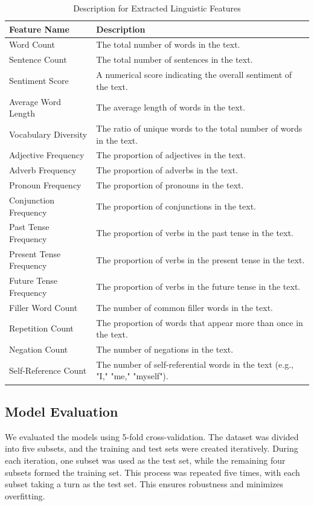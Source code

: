 \documentclass[12pt]{article}
\begin{document}
\begin{table}[H]
\centering
\begin{tabular}{p{5cm}p{7cm}}
\hline
\textbf{Feature Name} & \textbf{Description} \\
\hline
Word Count & The total number of words in the text. \\
\hline
Sentence Count & The total number of sentences in the text. \\
\hline
Sentiment Score & A numerical score indicating the overall sentiment of the text. \\
\hline
Average Word Length & The average length of words in the text. \\
\hline
Vocabulary Diversity & The ratio of unique words to the total number of words in the text. \\
\hline
Adjective Frequency & The proportion of adjectives in the text. \\
\hline
Adverb Frequency & The proportion of adverbs in the text. \\
\hline
Pronoun Frequency & The proportion of pronouns in the text. \\
\hline
Conjunction Frequency & The proportion of conjunctions in the text. \\
\hline
Past Tense Frequency & The proportion of verbs in the past tense in the text. \\
\hline
Present Tense Frequency & The proportion of verbs in the present tense in the text. \\
\hline
Future Tense Frequency & The proportion of verbs in the future tense in the text. \\
\hline
Filler Word Count & The number of common filler words in the text. \\
\hline
Repetition Count & The proportion of words that appear more than once in the text. \\
\hline
Negation Count & The number of negations in the text. \\
\hline
Self-Reference Count & The number of self-referential words in the text (e.g., "I," "me," "myself"). \\
\hline
    
\end{tabular}
\caption{Description for Extracted Linguistic Features}
\end{table}

\subsection{Model Evaluation}
We evaluated the models using 5-fold cross-validation. The dataset was divided into five subsets, and the training and test sets were created iteratively. During each iteration, one subset was used as the test set, while the remaining four subsets formed the training set. This process was repeated five times, with each subset taking a turn as the test set. This ensures robustness and minimizes overfitting. 
  
\end{document}
